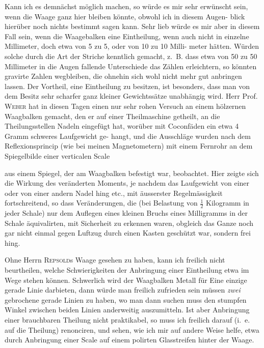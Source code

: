 \documentclass[12pt,a4paper]{article}
\theoremstyle{plain}
\theoremstyle{definition}
\theoremstyle{remark}
\begin{document}
Kann ich es demn\"achst m\"oglich machen, so w\"urde es mir sehr erw\"unscht
sein, wenn die Waage ganz hier bleiben k\"onnte, obwohl ich in diesem Augen-
blick hier\"uber noch nichts bestimmt sagen kann. Sehr lieb w\"urde es mir
aber in diesem Fall sein, wenn die Waagebalken eine Eintheilung, wenn auch
nicht in einzelne Millimeter, doch etwa von 5 zu 5, oder von 10 zu 10 Milli-
meter h\"atten. W\"urden solche durch die Art der Striche kenntlich gemacht,
z.~B. dass etwa von 50 zu 50 Millimeter in die Augen fallende Unterschiede
das Z\"ahlen erleichtern, so k\"onnten gravirte Zahlen wegbleiben, die ohnehin
sich wohl nicht mehr gut anbringen lassen. Der Vortheil, eine Eintheilung
zu besitzen, ist besonders, dass man von dem Besitz sehr scharfer ganz kleiner
Gewichtss\"atze unabh\"angig wird. Herr Prof. \textsc{Weber} hat in diesen Tagen
einen nur sehr rohen Versuch an einem h\"olzernen Waagbalken gemacht, den
er auf einer Theilmaschine getheilt, an die Theilungsstellen Nadeln eingef\"ugt
hat, wor\"uber mit Coconf\"aden ein etwa 4 Gramm schweres Laufgewicht ge-
hangt, und die Ausschl\"age wurden nach dem Reflexionsprincip (wie bei meinen
Magnetometern) mit einem Fernrohr an dem Spiegelbilde einer verticalen Scale

\newpage


aus einem Spiegel, der am Waagbalken befestigt war, beobachtet. Hier zeigte
sich die Wirkung des ver\"anderten Moments, je nachdem das Laufgewicht von
einer oder von einer andern Nadel hing etc., mit \"ausserster Regelm\"assigkeit
fortschreitend, so dass Ver\"anderungen, die (bei Belastung von $\frac{1}{2}$ Kilogramm
in jeder Schale) nur dem Auflegen eines kleinen Bruchs eines Milligramms
in der Schale \"aquivalirten, mit Sicherheit zu erkennen waren, obgleich das
Ganze noch gar nicht einmal gegen Luftzug durch einen Kasten gesch\"utzt
war, sondern frei hing.

Ohne Herrn \textsc{Repsold}s Waage gesehen zu haben, kann ich freilich nicht
beurtheilen, welche Schwierigkeiten der Anbringung einer Eintheilung etwa
im Wege stehen k\"onnen. Schwerlich wird der Waagbalken Metall f\"ur Eine
einzige gerade Linie darbieten, dann w\"urde man freilich zufrieden sein m\"ussen
\textit{zwei} gebrochene gerade Linien zu haben, wo man dann suchen muss den
stumpfen Winkel zwischen beiden Linien anderweitig auszumitteln. Ist aber
Anbringung einer brauchbaren Theilung nicht praktikabel, so muss ich freilich
darauf (i.~e. auf die Theilung) renonciren, und sehen, wie ich mir auf andere
Weise helfe, etwa durch Anbringung einer Scale auf einem polirten Glasstreifen
hinter der Waage.
\end{document}

